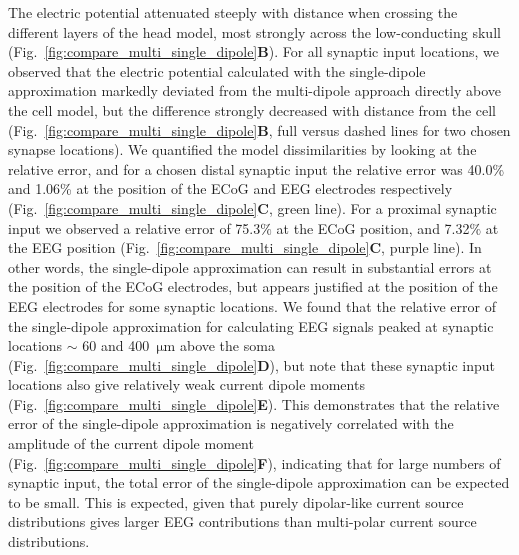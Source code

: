\documentclass[preprint,10pt,authoryear]{elsarticle}
\newcommand{\hlg}[2][Emerald]{ {\sethlcolor{#1} \hl{#2}} }
\newcommand{\tvnnote}[1]{\color{white}{\hlg{TVN: #1 }}\color{black}}
\newcommand{\tvntxt}[1]{{\color{Emerald}#1}}
\begin{document}
\tvntxt{The electric potential attenuated steeply with distance when crossing the different layers of the head model, most strongly across the low-conducting skull (Fig.~\ref{fig:compare_multi_single_dipole}\textbf{B}). 
	For all synaptic input locations, we observed that the electric potential calculated with the single-dipole approximation markedly deviated from the multi-dipole approach directly above the cell model, but the difference strongly decreased with distance from the cell (Fig.~\ref{fig:compare_multi_single_dipole}\textbf{B}, full versus dashed lines for two chosen synapse locations). 
	We quantified the model dissimilarities by looking at the relative error, and for a chosen distal synaptic input the relative error was 40.0\% and 1.06\% at the position of the ECoG and EEG electrodes respectively (Fig.~\ref{fig:compare_multi_single_dipole}\textbf{C}, green line). For a proximal synaptic input we observed a relative error of 75.3$\%$ at the ECoG position, and 7.32$\%$ at the EEG position (Fig.~\ref{fig:compare_multi_single_dipole}\textbf{C}, purple line).
	In other words, the single-dipole approximation can result in substantial errors at the position of the ECoG electrodes, but appears justified at the position of the EEG electrodes for some synaptic locations. We found that the relative error of the single-dipole approximation for calculating EEG signals peaked at synaptic locations $\sim$ 60 and 400~$\si{\um}$
	above the soma (Fig.~\ref{fig:compare_multi_single_dipole}\textbf{D}),
	but note that these synaptic input locations also give relatively weak current dipole moments (Fig.~\ref{fig:compare_multi_single_dipole}\textbf{E}).
	This demonstrates that the relative error of the single-dipole approximation is negatively correlated with the amplitude of the current dipole moment (Fig.~\ref{fig:compare_multi_single_dipole}\textbf{F}), indicating that for large numbers of synaptic input, the total error of the single-dipole approximation can be expected to be small. This is expected, given that purely dipolar-like current source distributions gives larger EEG contributions than multi-polar current source distributions.
}

\end{document}
